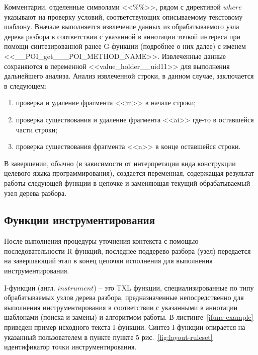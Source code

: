 Комментарии, отделенные символами <<\%\%>>, рядом с директивой $where$ указывают на проверку условий, соответствующих описываемому текстовому шаблону.
Вначале выполняется извлечение данных из обрабатываемого узла дерева разбора в соответствии с указанной в аннотации точкой интереса при помощи синтезированной ранее G-функции (подробнее о них далее) с именем <<\_\_POI\_get\_\_\_POI\_METHOD\_NAME>>.
Извлеченные данные сохраняются в переменной <<value\_holder\_\_uid11>> для выполнения дальнейшего анализа.
Анализ извлеченной строки, в данном случае, заключается в следующем:

\begin{enumerate}[noitemsep]
  \item проверка и удаление фрагмента <<m>> в начале строки;
  \item проверка существования и удаление фрагмента <<ai>> где-то в оставшейся части строки;
  \item проверка существования фрагмента <<n>> в конце оставшейся строки.
\end{enumerate}

В завершении, обычно (в зависимости от интерпретации вида конструкции целевого языка программирования), создается переменная, содержащая результат работы следующей функции в цепочке и заменяющая текущий обрабатываемый узел дерева разбора.

\subsection{Функции инструментирования}

После выполнения процедуры уточнения контекста с помощью последовательности R-функций, последнее поддерево разбора (узел) передается на завершающий этап в конец цепочки исполнения для выполнения инструментирования.

I-функции (англ. $instrument$) -- это TXL функции, специализированные по типу обрабатываемых узлов дерева разбора, предназначенные непосредственно для выполнения инструментирования в соответствии с указанными в аннотации шаблонами (поиска и замены) и алгоритмом работы.
В листинге~\ref{ifunc-example} приведен пример исходного текста I-функции.
Синтез I-функции опирается на указанный пользователем в пункте пункте 5 рис.~\ref{fig:layout-ruleset} идентификатор точки инструментирования.

